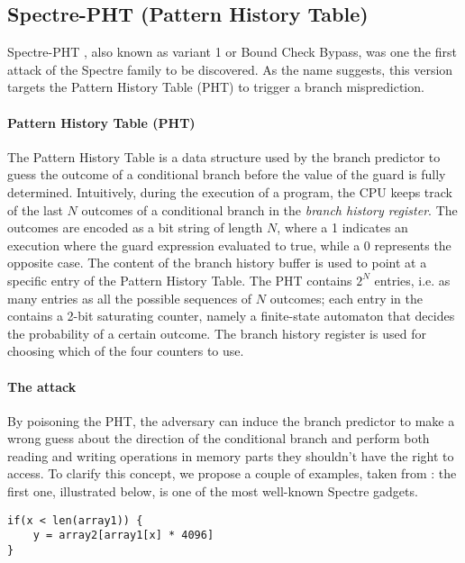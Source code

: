 \documentclass[target=mst,aauheader=aics]{thud}
\theoremstyle{definition}
\begin{document}
	\subsection{Spectre-PHT (Pattern History Table)}\label{sec:spectre-pht}
	Spectre-PHT \cite{Kocher2019}\cite{Canella2019}\cite{Evtyushkin2018}, also known as variant 1 or Bound Check Bypass, was one the first attack of the Spectre family to be discovered. As the name suggests, this version targets the Pattern History Table (PHT) to trigger a branch misprediction.
	\paragraph{Pattern History Table (PHT)} The Pattern History Table \cite{Fog2021} is a data structure used by the branch predictor to guess the outcome of a conditional branch before the value of the guard is fully determined. Intuitively, during the execution of a program, the CPU keeps track of the last $N$ outcomes of a conditional branch in the \textit{branch history register}. The outcomes are encoded as a bit string of length $N$, where a 1 indicates an execution where the guard expression evaluated to true, while a 0 represents the opposite case. The content of the branch history buffer is used to point at a specific entry of the Pattern History Table. The PHT contains $2^N$ entries, i.e. as many entries as all the possible sequences of $N$ outcomes; each entry in
	the contains a 2-bit saturating counter, namely a finite-state automaton that decides the probability of a certain outcome. The branch history register is used for choosing which of the four counters to use.
	
	\paragraph{The attack} By poisoning the PHT, the adversary can induce the branch predictor to make a wrong guess about the direction of the conditional branch and perform both reading and writing operations in memory parts they shouldn't have the right to access. To clarify this concept, we propose a couple of examples, taken from \cite{Canella2019}: the first one, illustrated below, is one of the most well-known Spectre gadgets.
	
	\vspace{3mm}
	\begin{minipage}{.5\textwidth}
	\begin{lstlisting}
if(x < len(array1)) {
	y = array2[array1[x] * 4096]
}
	\end{lstlisting}
	\end{minipage}
	
\end{document}
